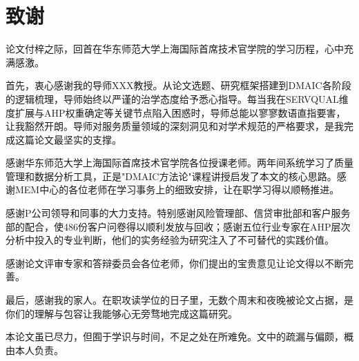 \chapter*{致谢}

论文付梓之际，回首在华东师范大学上海国际首席技术官学院的学习历程，心中充满感激。

首先，衷心感谢我的导师XXX教授。从论文选题、研究框架搭建到DMAIC各阶段的逻辑梳理，导师始终以严谨的治学态度给予悉心指导。每当我在SERVQUAL维度扩展与AHP权重确定等关键节点陷入困惑时，导师总能以寥寥数语直指要害，让我豁然开朗。导师对服务质量领域的深刻洞见和对学术规范的严格要求，是我完成这篇论文最坚实的支撑。

感谢华东师范大学上海国际首席技术官学院各位授课老师。两年间系统学习了质量管理和数据分析工具，正是"DMAIC方法论"课程讲授启发了本文的核心思路。感谢MEM中心的各位老师在学习事务上的细致安排，让在职学习得以顺畅推进。

感谢P公司领导和同事的大力支持。特别感谢风险管理部、信贷审批部和客户服务部的配合，使486份客户问卷得以顺利发放与回收；感谢五位行业专家在AHP层次分析中投入的专业判断，他们的实务经验为研究注入了不可替代的实践价值。

感谢论文评审专家和答辩委员会各位老师，你们提出的宝贵意见让论文得以不断完善。

最后，感谢我的家人。在职攻读学位的日子里，无数个周末和夜晚被论文占据，是你们的理解与包容让我能够心无旁骛地完成这篇研究。

本论文虽已尽力，但囿于学识与时间，不足之处在所难免。文中的疏漏与偏颇，概由本人负责。
